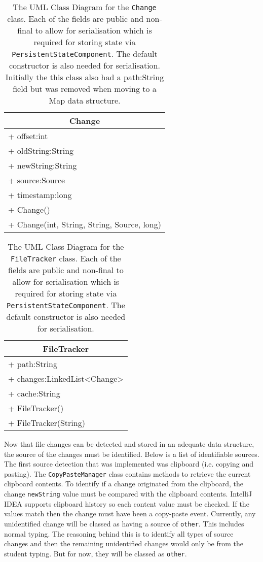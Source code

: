 \begin{table}[H]
\centering
\begin{tabular}{|l|}
\hline
\multicolumn{1}{|c|}{\textbf{Change}}\\ \hline
+ offset:int\\
+ oldString:String\\
+ newString:String\\
+ source:Source\\
+ timestamp:long\\ \hline
+ Change()\\
+ Change(int, String, String, Source, long)\\ \hline
\end{tabular}
\caption[Change UML Class Diagram]{The UML Class Diagram for the \texttt{Change} class. Each of the fields are public and non-final to allow for serialisation which is required for storing state via \texttt{PersistentStateComponent}. The default constructor is also needed for serialisation. Initially the this class also had a path:String field but was removed when moving to a Map data structure.}
\label{uml:class-change}
\end{table}

\begin{table}[H]
\centering
\begin{tabular}{|l|}
\hline
\multicolumn{1}{|c|}{\textbf{FileTracker}}\\ \hline
+ path:String\\
+ changes:LinkedList<Change>\\
+ cache:String\\ \hline
+ FileTracker()\\
+ FileTracker(String)\\ \hline
\end{tabular}
\caption[FileTracker UML Class Diagram]{The UML Class Diagram for the \texttt{FileTracker} class. Each of the fields are public and non-final to allow for serialisation which is required for storing state via \texttt{PersistentStateComponent}. The default constructor is also needed for serialisation.}
\label{uml:class-filetracker}
\end{table}

Now that file changes can be detected and stored in an adequate data structure, the source of the changes must be identified. Below is a list of identifiable sources. The first source detection that was implemented was clipboard (i.e. copying and pasting). The \texttt{CopyPasteManager} class contains methods to retrieve the current clipboard contents. To identify if a change originated from the clipboard, the change \texttt{newString} value must be compared with the clipboard contents. IntelliJ IDEA supports clipboard history so each content value must be checked. If the values match then the change must have been a copy-paste event. Currently, any unidentified change will be classed as having a source of \texttt{other}. This includes normal typing. The reasoning behind this is to identify all types of source changes and then the remaining unidentified changes would only be from the student typing. But for now, they will be classed as \texttt{other}.

